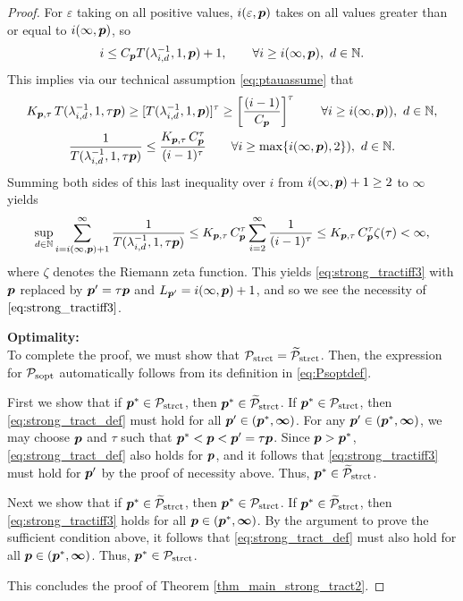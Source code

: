 \documentclass[11pt,a4paper]{article}
\newcommand{\vinfty}{\boldsymbol{\infty}}
\begin{document}
\begin{proof}
For $\varepsilon$ taking on all positive values, $i(\varepsilon,\boldsymbol{p})$ takes on all values greater than or equal to $i(\infty,\boldsymbol{p})$, so
\[
i\le C_{\boldsymbol{p}} T(\lambda_{i,d}^{-1},1,\boldsymbol{p})+1, \qquad \forall i \ge i(\infty,\boldsymbol{p}), \ d \in \mathbb{N}.
\]
This implies via our technical assumption \eqref{eq:ptauassume} that
\begin{gather*}
 K_{\boldsymbol{p},\tau}\,T (\lambda_{i,d}^{-1},1,\tau \boldsymbol{p}) \ge
 [T(\lambda_{i,d}^{-1},1, \boldsymbol{p})]^\tau
 \ge
  \left[\frac{(i-1)}{C_{\boldsymbol{p}}}\right]^\tau \qquad \forall i \ge i(\infty,\boldsymbol{p})), \ d \in \mathbb{N}, \\
 \frac{1}{T (\lambda_{i,d}^{-1},1,\tau \boldsymbol{p})} \le
\frac{K_{\boldsymbol{p},\tau}\, C_{\boldsymbol{p}}^\tau}{(i-1)^\tau}\qquad \forall i \ge \max\{i(\infty,\boldsymbol{p}),2\}), \ d \in \mathbb{N} .
\end{gather*}
Summing both sides of this last inequality over $i$ from $i(\infty,\boldsymbol{p}) +1 \ge 2$ to $\vinfty$ yields
\begin{equation*}
\sup_{d\in\mathbb{N}} \sum_{i=i(\infty,\boldsymbol{p}) +1 }^\infty \frac{1}{T (\lambda_{i,d}^{-1},1, \tau \boldsymbol{p})}
 \le  K_{\boldsymbol{p},\tau}\, C_{\boldsymbol{p}}^\tau
\sum_{i=2}^\infty \frac{1}{(i-1)^\tau} \\
 \le K_{\boldsymbol{p},\tau}\, C_{\boldsymbol{p}}^\tau
\zeta (\tau)  < \infty,
\end{equation*}
where $\zeta$ denotes the Riemann zeta function.
This yields \eqref{eq:strong_tractiff3} with $\boldsymbol{p}$ replaced by $\boldsymbol{p}' = \tau \boldsymbol{p}$ and $L_{\boldsymbol{p}'} = i(\infty,\boldsymbol{p}) +1$, and so we see the necessity of $\eqref{eq:strong_tractiff3}$.

\bigskip
\noindent \textbf{Optimality:} \\
To complete the proof, we must show that $\mathcal{P}_{\textup{strct}} = \widetilde{\mathcal{P}}_{\textup{strct}}$.  Then, the expression for  $\mathcal{P}_{\textup{sopt}}$ automatically follows from its definition in \eqref{eq:Psoptdef}.

First we show  that if $\boldsymbol{p}^* \in \mathcal{P}_{\textup{strct}}$, then $\boldsymbol{p}^* \in \widetilde{\mathcal{P}}_{\textup{strct}}$.  If $\boldsymbol{p}^* \in \mathcal{P}_{\textup{strct}}$, then \eqref{eq:strong_tract_def} must hold for all $\vp' \in (\vp^*,\vinfty)$.  For any $\vp' \in (\vp^*,\vinfty)$, we may choose $\boldsymbol{p}$ and $\tau$ such that $\boldsymbol{p}^* < \boldsymbol{p} < \boldsymbol{p}' = \tau \boldsymbol{p}$. Since $\boldsymbol{p} > \boldsymbol{p}^*$, \eqref{eq:strong_tract_def} also holds for $\boldsymbol{p}$, and it follows that \eqref{eq:strong_tractiff3} must hold for $\boldsymbol{p}'$ by the proof of necessity above.  Thus, $\boldsymbol{p}^* \in \widetilde{\mathcal{P}}_{\textup{strct}}$.

Next we show that if $\boldsymbol{p}^* \in \widetilde{\mathcal{P}}_{\textup{strct}}$, then $\boldsymbol{p}^* \in \mathcal{P}_{\textup{strct}}$.  If $\boldsymbol{p}^* \in \widetilde{\mathcal{P}}_{\textup{strct}}$, then \eqref{eq:strong_tractiff3}  holds for all $\vp \in (\vp^*,\vinfty)$.  By the argument to prove the sufficient condition above, it follows that \eqref{eq:strong_tract_def} must also hold for all $\vp \in (\vp^*,\vinfty)$. Thus, $\boldsymbol{p}^* \in \mathcal{P}_{\textup{strct}}$.

\bigskip

\noindent This concludes the proof of  Theorem \ref{thm_main_strong_tract2}.

\end{proof}
\end{document}
